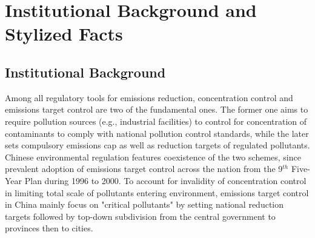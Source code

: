 \documentclass[12pt,english]{article}
\begin{document}
\section{Institutional Background and Stylized Facts}\label{sec:institution}

\subsection{Institutional Background}\label{sec:background}

Among all regulatory tools for emissions reduction, concentration control and emissions target control are two of the fundamental ones. The former one aims to require pollution sources (e.g., industrial facilities) to control for concentration of contaminants to comply with national pollution control standards, while the later sets compulsory emissions cap as well as reduction targets of regulated pollutants. Chinese environmental regulation features coexistence of the two schemes, since prevalent adoption of emissions target control across the nation from the 9$^{th}$ Five-Year Plan during 1996 to 2000. To account for invalidity of concentration control in limiting total scale of pollutants entering environment, emissions target control in China mainly focus on "critical pollutants" by setting national reduction targets followed by top-down subdivision from the central government to provinces then to cities. %
\end{document}
